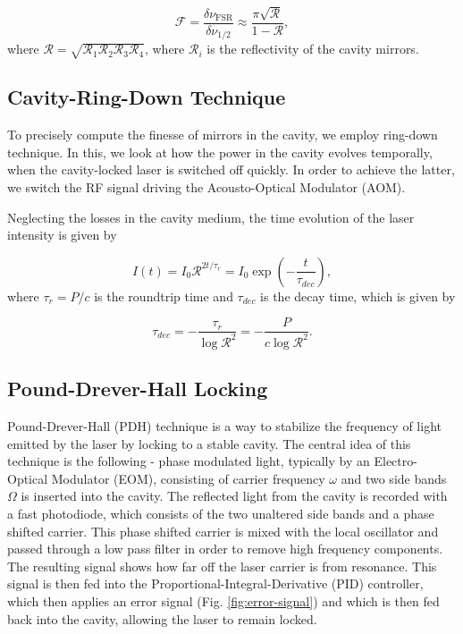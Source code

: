 \documentclass[a4paper]{report}
\numberwithin{equation}{section}
\begin{document}
\begin{equation} \label{eqn:finesse}
		\mathcal{F} = \frac{\delta \nu_{\mathrm{FSR}}}{\delta \nu_{1/2}} \approx \frac{\pi \sqrt{\mathcal{R}}}{1 - \mathcal{R}},
\end{equation}
where $\mathcal{R} = \sqrt{\mathcal{R}_{1} \mathcal{R}_{2} \mathcal{R}_{3} \mathcal{R}_{4}}$, where $\mathcal{R}_{i}$ is the reflectivity of the cavity mirrors. 

\subsection{Cavity-Ring-Down Technique} \label{sec:ring-down}
To precisely compute the finesse of mirrors in the cavity, we employ ring-down technique. In this, we look at how the power in the cavity evolves temporally, when the cavity-locked laser is switched off quickly. In order to achieve the latter, we switch the RF signal driving the Acousto-Optical Modulator (AOM). 

Neglecting the losses in the cavity medium, the time evolution of the laser intensity is given by

\begin{equation}
		\label{eqn:ring-down}
		I(t) = I_{0}\mathcal{R}^{2t/\tau _{r}} = I_{0} \exp\left(-\frac{t}{\tau _{dec}}\right),
\end{equation}
where $\tau _{r} = P /c $ is the roundtrip time and $\tau _{dec}$ is the decay time, which is given by

\begin{equation}\label{eqn:reflec}
		\tau _{dec} = -\frac{\tau _{r}}{\log \mathcal{R}^2} = - \frac{P}{c \log \mathcal{R}^2}.
\end{equation}

\subsection{Pound-Drever-Hall Locking}
Pound-Drever-Hall (PDH) technique is a way to stabilize the frequency of light emitted by the laser by locking to a stable cavity. The central idea of this technique is the following - phase modulated light, typically by an Electro-Optical Modulator (EOM), consisting of carrier frequency $\omega$ and two side bands $\Omega$ is inserted into the cavity. The reflected light from the cavity is recorded with a fast photodiode, which consists of the two unaltered side bands and a phase shifted carrier. This phase shifted carrier is mixed with the local oscillator and passed through a low pass filter in order to remove high frequency components. The resulting signal shows how far off the laser carrier is from resonance. This signal is then fed into the Proportional-Integral-Derivative (PID) controller, which then applies an error signal (Fig. \ref{fig:error-signal}) and which is then fed back into the cavity, allowing the laser to remain locked.
\end{document}
